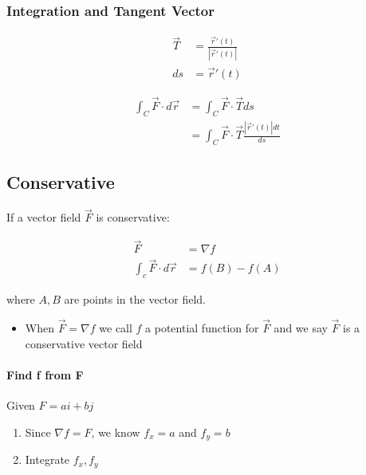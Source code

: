     \subsubsection{Integration and Tangent Vector}

      \begin{align*}
        \vec{T} &= \frac{\vec{r}'\left( t \right)}{\left| \vec{r}'\left( t \right) \right|} \\
        ds &= \vec{r}'\left( t \right)
      \end{align*}

      \begin{align*}
        \int_{C} \vec{F} \cdot d \vec{r}
        &= \int_{C} \vec{F} \cdot \vec{T} ds \\
        &= \int_{C} \vec{F} \cdot \vec{T} \frac{\left| \vec{r}'\left( t \right) \right| dt}{ds}
      \end{align*}

  \subsection{Conservative}

    If a vector field $ \vec{F} $ is conservative:

    \begin{align}
      \vec{F} &= \nabla f \\
      \int_{c} \vec{F} \cdot d \vec{r} &= f\left( B \right) - f\left( A \right)
    \end{align}

    where $ A, B $ are points in the vector field.

    \begin{itemize}
      \item When $ \vec{F} = \nabla f $ we call $ f $ a potential function
      for $ \vec{F} $ and we say $ \vec{F} $ is a conservative vector field
    \end{itemize}

    \paragraph{Find f from F}
    Given $ F = ai + bj $

    \begin{enumerate}
      \item Since $ \nabla f = F $, we know $ f_{x} = a $  and
      $ f_{y} = b $
      \item Integrate $ f_{x}, f_{y} $
    \end{enumerate}

